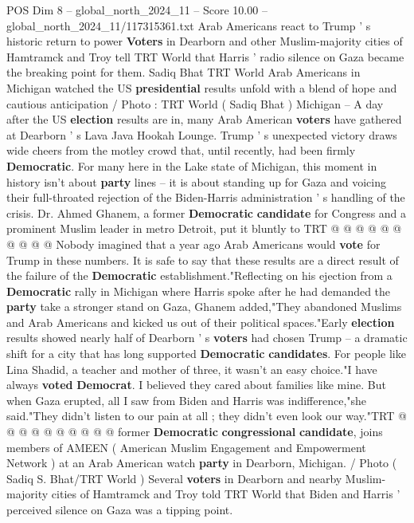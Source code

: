 \begin{textsample}{POS Dim 8 – global\_north\_2024\_11 – Score 10.00 – global\_north\_2024\_11/117315361.txt}  \label{ex:f8_pos_158}
Arab Americans react to Trump ' s historic return to power \textbf{Voters} in Dearborn and other Muslim-majority cities of Hamtramck and Troy tell TRT World that Harris ' radio silence on Gaza became the breaking point for them.
Sadiq Bhat TRT World Arab Americans in Michigan watched the US \textbf{presidential} results unfold with a blend of hope and cautious anticipation / Photo : TRT World ( Sadiq Bhat ) Michigan -- A day after the US \textbf{election} results are in, many Arab American \textbf{voters} have gathered at Dearborn ' s Lava Java Hookah Lounge.
Trump ' s unexpected victory draws wide cheers from the motley crowd that, until recently, had been firmly \textbf{Democratic}.
For many here in the Lake state of Michigan, this moment in history isn't about \textbf{party} lines -- it is about standing up for Gaza and voicing their full-throated rejection of the Biden-Harris administration ' s handling of the crisis.
Dr.
Ahmed Ghanem, a former \textbf{Democratic} \textbf{candidate} for Congress and a prominent Muslim leader in metro Detroit, put it bluntly to TRT @ @ @ @ @ @ @ @ @ @ Nobody imagined that a year ago Arab Americans would \textbf{vote} for Trump in these numbers.
It is safe to say that these results are a direct result of the failure of the \textbf{Democratic} establishment."Reflecting on his ejection from a \textbf{Democratic} rally in Michigan where Harris spoke after he had demanded the \textbf{party} take a stronger stand on Gaza, Ghanem added,"They abandoned Muslims and Arab Americans and kicked us out of their political spaces."Early \textbf{election} results showed nearly half of Dearborn ' s \textbf{voters} had chosen Trump -- a dramatic shift for a city that has long supported \textbf{Democratic} \textbf{candidates}.
For people like Lina Shadid, a teacher and mother of three, it wasn't an easy choice."I have always \textbf{voted} \textbf{Democrat}.
I believed they cared about families like mine.
But when Gaza erupted, all I saw from Biden and Harris was indifference,"she said."They didn't listen to our pain at all ; they didn't even look our way."TRT @ @ @ @ @ @ @ @ @ @ former \textbf{Democratic} \textbf{congressional} \textbf{candidate}, joins members of AMEEN ( American Muslim Engagement and Empowerment Network ) at an Arab American watch \textbf{party} in Dearborn, Michigan. / Photo ( Sadiq S.
Bhat/TRT World ) Several \textbf{voters} in Dearborn and nearby Muslim-majority cities of Hamtramck and Troy told TRT World that Biden and Harris ' perceived silence on Gaza was a tipping point.

\end{textsample}
